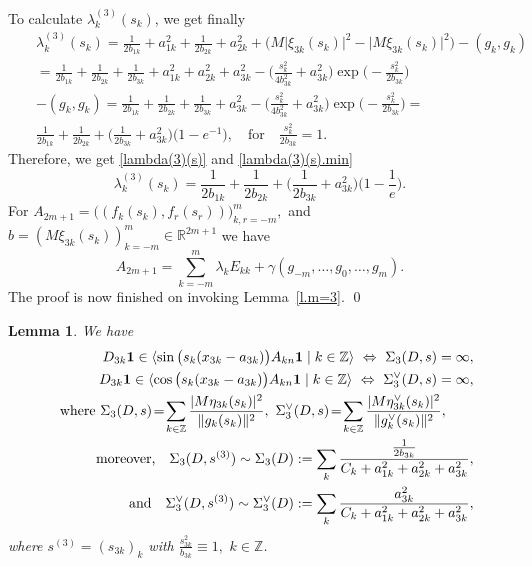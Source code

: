 \documentclass[preprint,12pt]{elsarticle}
\newtheorem{lem}[thm]{Lemma}
\numberwithin{equation}{section}
\begin{document}
\begin{pf}
To calculate $\lambda_k^{(3)}(s_k)$, we get finally
\begin{eqnarray*}
&&\lambda_k^{(3)}(s_k)\!=\!\frac{1}{2b_{1k}}\!+\!a_{1k}^2\!+\!\frac{1}{2b_{2k}}\!+\!a_{2k}^2\!+\!\Big(M\vert\xi_{3k}(s_k)\vert^2\!-\!\vert M\xi_{3k}(s_k)\vert^2\Big)\!-\!(g_k,g_k)\\
&&=\frac{1}{2b_{1k}}+\frac{1}{2b_{2k}}+\frac{1}{2b_{3k}}+a_{1k}^2+a_{2k}^2+a_{3k}^2-
\Big(\frac{s_k^2}{4b^2_{3k}}+a_{3k}^2\Big)\exp\big(-\frac{s_k^2}{2b_{3k}}\big)\\
&&-(g_k,g_k)=\frac{1}{2b_{1k}}+\frac{1}{2b_{2k}}+\frac{1}{2b_{3k}}+a_{3k}^2-
\Big(\frac{s_k^2}{4b^2_{3k}}+a_{3k}^2\Big)\exp\big(-
\frac{s_k^2}{2b_{3k}}\big)=\\
&&
\frac{1}{2b_{1k}}+\frac{1}{2b_{2k}}+\Big(\frac{1}{2b_{3k}}+a_{3k}^2\Big)\big(1-e^{-1}\big),\quad  \text{for}\quad 
\frac{s_k^2}{2b_{3k}}=1.
\end{eqnarray*}
Therefore, we get \eqref{lambda(3)(s)} and \eqref{lambda(3)(s).min}
$$
\lambda_k^{(3)}(s_k)=\frac{1}{2b_{1k}}+\frac{1}{2b_{2k}}+
\Big(\frac{1}{2b_{3k}}+a_{3k}^2\Big)\big(1-\frac{1}{e}\big).
$$
 For $A_{2m+1}=\big((f_k(s_k),f_r(s_r))\big)_{k,r=-m}^m,$ and
$b=(M\xi_{3k}(s_k))_{k=-m}^m\in {\mathbb R}^{2m+1}$ we have
$$
A_{2m+1}= \sum_{k=-m}^m\lambda_kE_{kk}+\gamma(g_{-m},\dots,g_0,\dots,g_m).
$$
The proof is now finished on invoking Lemma~\ref{l.m=3}.
\qed\end{pf}
\begin{lem}
\label{l.Re-Im-exp.3}
We have
\begin{eqnarray}
\label{Re-exp}
&&
D_{3k}{\bf 1}\in \langle 
\sin\big(s_k(x_{3k}-a_{3k})\big)A_{kn}{\bf 1}\mid k\in {\mathbb Z}\rangle
\,\,\Leftrightarrow\,\, 
\Sigma_3(D,s)=\infty,\\
\label{Im-exp}
&&D_{3k}{\bf 1}\in \langle 
\cos\big(s_k(x_{3k}-a_{3k})\big)A_{kn}{\bf 1}\mid k\in {\mathbb Z}\rangle
\,\,\Leftrightarrow\,\, 
\Sigma^{\vee}_3(D,s)=\infty,\\
\label{D(3.sin-cos)}
&&\text{where}\,\,\Sigma_3(D,s)\!=\!\sum_{k\in \mathbb Z}\frac{\vert M\eta_{3k}(s_k)\vert^2}{\Vert g_{k}(s_k)\Vert^2},
\,\, \Sigma^{\vee}_3(D,s)\!=\!\sum_{k\in \mathbb Z}\frac{\vert M\eta^{\vee}_{3k}(s_k)\vert^2}{\Vert g^{\vee}_{k}(s_k)\Vert^2},\qquad
\\
\label{sim-b.3}
&&
\text{moreover,}
\quad \Sigma_3(D,s^{(3)})
\sim \Sigma_3(D):=\sum_k\frac{\frac{1}{2b_{3k}}}{C_k+a^2_{1k}+a^2_{2k}+a^2_{3k}},\\
\label{sim-a.3}
&&
\text{and}\quad \Sigma^{\vee}_3(D,s^{(3)})\sim \Sigma^{\vee}_3(D):=\sum_k\frac{a^2_{3k}}{C_k+a^2_{1k}+a^2_{2k}+a^2_{3k}},
\end{eqnarray}
where $s^{(3)}=(s_{3k})_k$
with $\frac{s^2_{3k}}{b_{3k}}\equiv 1,\,\,k\in \mathbb Z$.
\end{lem}
\end{document}
